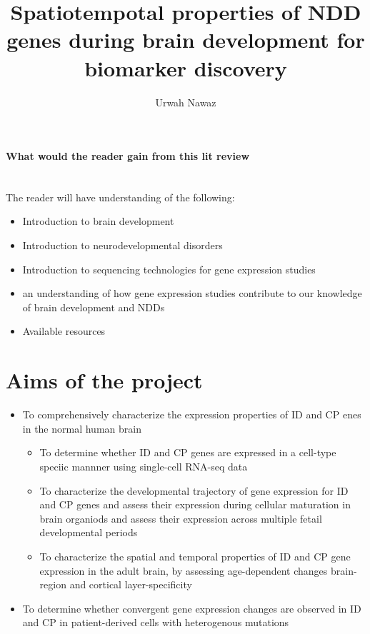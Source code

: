 \documentclass[12pt]{article}
\title{Spatiotempotal properties of NDD genes during brain development for biomarker discovery}
\author{Urwah Nawaz}
\begin{document}
\begin{titlepage}
    \maketitle
\end{titlepage}

\paragraph{What would the reader gain from this lit review}

~\\ The reader will have understanding of the following: 

\begin{itemize}
	\item Introduction to brain development 
	\item Introduction to neurodevelopmental disorders
	\item Introduction to sequencing technologies for gene expression studies 
	\item an understanding of how gene expression studies contribute to our knowledge of brain development and NDDs
	\item Available resources
\end{itemize}


\section{Aims of the project}

\begin{itemize}
	\item To comprehensively characterize the expression properties of ID and CP enes in the normal human brain
	\begin{itemize}
		\item To determine whether ID and CP genes are expressed in a cell-type speciic mannner using single-cell RNA-seq data
		\item To characterize the developmental trajectory of gene expression for ID and CP genes and assess their expression during cellular maturation in brain organiods and assess their expression across multiple fetail developmental periods 
		\item  To characterize the spatial and temporal properties of ID and CP gene expression in the adult brain, by assessing age-dependent changes  brain-region and cortical layer-specificity 
		
	\end{itemize}
	
	\item To determine whether convergent gene expression changes are observed in ID and CP in patient-derived cells with heterogenous mutations 
	
\end{itemize}
\end{document}
